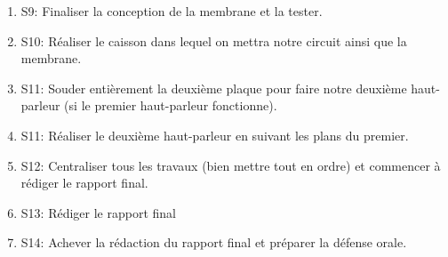 \begin{enumerate}
	\item{S9}: Finaliser la conception de la membrane et la tester.
	\item{S10}: Réaliser le caisson dans lequel on mettra notre circuit ainsi que la membrane.
	\item{S11}: Souder entièrement la deuxième plaque pour faire notre deuxième haut-parleur (si le premier haut-parleur fonctionne).
	\item{S11}: Réaliser le deuxième haut-parleur en suivant les plans du premier.
	\item{S12}: Centraliser tous les travaux (bien mettre tout en ordre) et commencer à rédiger le rapport final.
	\item{S13}: Rédiger le rapport final
	\item{S14}: Achever la rédaction du rapport final et préparer la défense orale.
\end{enumerate}

